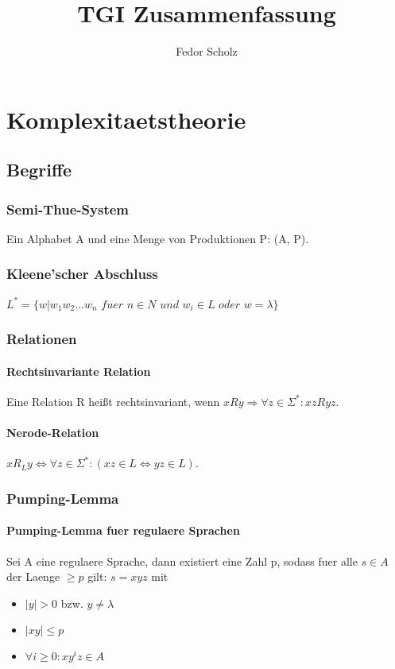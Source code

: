 \documentclass[a4paper]{scrreprt}
\begin{document}
\title{TGI Zusammenfassung}
\author{Fedor Scholz}
\maketitle

\tableofcontents
\vspace{1cm}

\chapter{Komplexitaetstheorie}



\section{Begriffe}

\subsection{Semi-Thue-System}
Ein Alphabet A und eine Menge von Produktionen P: (A, P).

\subsection{Kleene'scher Abschluss}
$L^* = \{w|w_1w_2...w_n$ $fuer$ $n \in N$ $und$ $w_i \in L$ $oder$ $w = \lambda\}$

\subsection{Relationen}
\subsubsection{Rechtsinvariante Relation}
Eine Relation R heißt rechtsinvariant, wenn $xRy \Rightarrow \forall z \in \Sigma^*: xzRyz$.

\subsubsection{Nerode-Relation}
$xR_Ly \Leftrightarrow \forall z \in \Sigma^*: (xz \in L \Leftrightarrow yz \in L)$.

\subsection{Pumping-Lemma}
\subsubsection{Pumping-Lemma fuer regulaere Sprachen}
Sei A eine regulaere Sprache, dann existiert eine Zahl p, sodass fuer alle $s \in A$ der Laenge $\ge p$ gilt: $s = xyz$ mit
\begin{itemize}
	\item $|y| > 0$ bzw. $y \neq \lambda$
	\item $|xy| \le p$
	\item $\forall i \ge 0: xy^iz \in A$
\end{itemize}
\end{document}
